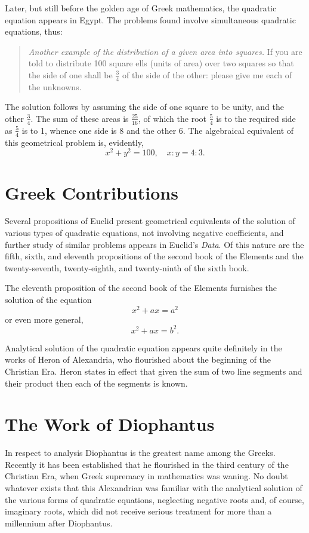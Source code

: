 \documentclass[11pt,a4paper,twoside]{book}
\begin{document}
Later, but still before the golden age of Greek mathematics, the quadratic equation appears in Egypt. The problems found involve simultaneous quadratic equations, thus:

\begin{quote}
\textit{Another example of the distribution of a given area into squares.} If you are told to distribute 100 square ells (units of area) over two squares so that the side of one shall be $\frac{3}{4}$ of the side of the other: please give me each of the unknowns.
\end{quote}

The solution follows by assuming the side of one square to be unity, and the other $\frac{3}{4}$. The sum of these areas is $\frac{25}{16}$, of which the root $\frac{5}{4}$ is to the required side as $\frac{5}{4}$ is to 1, whence one side is 8 and the other 6. The algebraical equivalent of this geometrical problem is, evidently,
\[x^2 + y^2 = 100, \quad x : y = 4 : 3.\]

\section{Greek Contributions}

Several propositions of Euclid present geometrical equivalents of the solution of various types of quadratic equations, not involving negative coefficients, and further study of similar problems appears in Euclid's \textit{Data}. Of this nature are the fifth, sixth, and eleventh propositions of the second book of the Elements and the twenty-seventh, twenty-eighth, and twenty-ninth of the sixth book.

The eleventh proposition of the second book of the Elements furnishes the solution of the equation
\[x^2 + ax = a^2\]
or even more general,
\[x^2 + ax = b^2.\]

Analytical solution of the quadratic equation appears quite definitely in the works of Heron of Alexandria, who flourished about the beginning of the Christian Era. Heron states in effect that given the sum of two line segments and their product then each of the segments is known.

\section{The Work of Diophantus}

In respect to analysis Diophantus is the greatest name among the Greeks. Recently it has been established that he flourished in the third century of the Christian Era, when Greek supremacy in mathematics was waning. No doubt whatever exists that this Alexandrian was familiar with the analytical solution of the various forms of quadratic equations, neglecting negative roots and, of course, imaginary roots, which did not receive serious treatment for more than a millennium after Diophantus.
\end{document}
